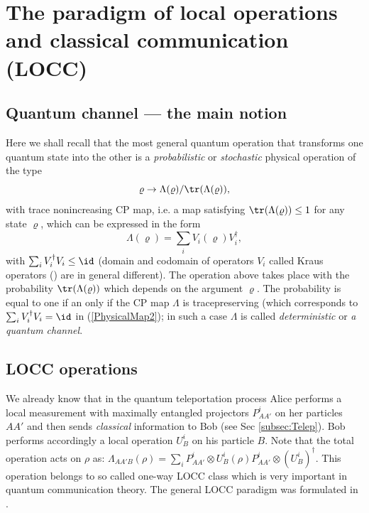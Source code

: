\documentclass[twocolumn,aps,rmp]{revtex4}
\begin{document}
\section{The paradigm of local operations and classical communication (LOCC)}
\label{sec:LOCC}


\subsection{Quantum channel --- the main notion}

Here we shall recall that the most general quantum operation that
transforms one quantum state into the other is a {\it probabilistic}
or {\it stochastic} physical operation of the type
\begin{equation}
\varrho \rightarrow \Lambda(\varrho)/{\tr}(\Lambda(\varrho)),
\label{PhysicalMap}
\end{equation}
with trace nonincreasing CP map, i.e. a map satisfying
${\tr}(\Lambda(\varrho))\leq 1$ for any state $\varrho$, which can be
expressed in the form
\begin{equation}
\Lambda(\varrho)=\sum_i V_{i}(\varrho)V_{i}^{\dagger},
\label{PhysicalMap2}
\end{equation}
with $\sum_{i}V_{i}^{\dagger}V_{i}\leq \id$ (domain and codomain of
operators $V_{i}$ called Kraus operators (\cite{KrausOperators}) are in general different). The operation above takes place
with the probability ${\tr}(\Lambda(\varrho))$ which depends on the
argument $\varrho$. The probability is equal to one if an only if
the CP map $\Lambda$ is tracepreserving (which corresponds to
$\sum_{i}V_{i}^{\dagger}V_{i}=\id$ in (\ref{PhysicalMap2}); in such a
case $\Lambda$ is called {\it deterministic} or {\it a quantum
channel}.

\subsection{LOCC operations}
\label{subsec:locc}

We already know that in the quantum teleportation process Alice
performs a local measurement with maximally entangled projectors
$P_{AA'}^{i}$ on her particles $AA'$ and then sends {\it classical}
information to Bob (see Sec \ref{subsec:Telep}). Bob performs accordingly a local operation
$U^{i}_{B}$ on his particle $B$. Note that the total operation acts on
$\rho$ as: $\Lambda_{AA'B}(\rho)=\sum_{i}P_{AA'}^{i} \otimes
U^{i}_{B}(\rho) P_{AA'}^{i} \otimes (U^{i}_{B})^{\dagger}$. This
operation belongs to so called one-way LOCC class which is very
important in quantum communication theory. The general LOCC paradigm
was formulated in \cite{BDSW1996}.
\end{document}
